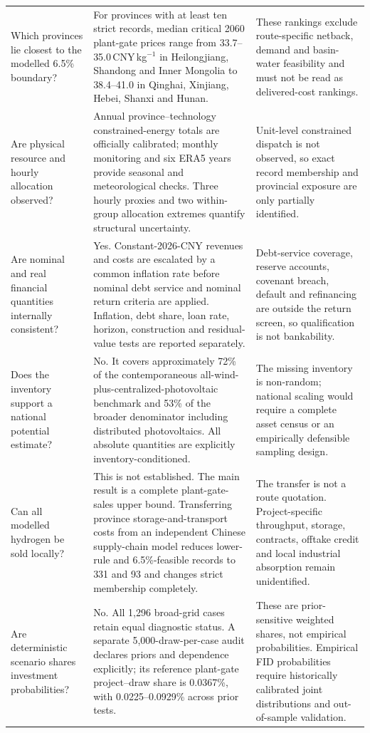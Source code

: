\documentclass[11pt,a4paper]{article}
\begin{document}
\begin{longtable}{>{\raggedright\arraybackslash}p{}>{\raggedright\arraybackslash}p{}>{\raggedright\arraybackslash}p{}}
Which provinces lie closest to the modelled 6.5\% boundary? & For provinces with at least ten strict records, median critical 2060 plant-gate prices range from 33.7--35.0\,CNY\,kg$^{-1}$ in Heilongjiang, Shandong and Inner Mongolia to 38.4--41.0 in Qinghai, Xinjiang, Hebei, Shanxi and Hunan. & These rankings exclude route-specific netback, demand and basin-water feasibility and must not be read as delivered-cost rankings. \\
Are physical resource and hourly allocation observed? & Annual province--technology constrained-energy totals are officially calibrated; monthly monitoring and six ERA5 years provide seasonal and meteorological checks. Three hourly proxies and two within-group allocation extremes quantify structural uncertainty. & Unit-level constrained dispatch is not observed, so exact record membership and provincial exposure are only partially identified. \\
Are nominal and real financial quantities internally consistent? & Yes. Constant-2026-CNY revenues and costs are escalated by a common inflation rate before nominal debt service and nominal return criteria are applied. Inflation, debt share, loan rate, horizon, construction and residual-value tests are reported separately. & Debt-service coverage, reserve accounts, covenant breach, default and refinancing are outside the return screen, so qualification is not bankability. \\
Does the inventory support a national potential estimate? & No. It covers approximately 72\% of the contemporaneous all-wind-plus-centralized-photovoltaic benchmark and 53\% of the broader denominator including distributed photovoltaics. All absolute quantities are explicitly inventory-conditioned. & The missing inventory is non-random; national scaling would require a complete asset census or an empirically defensible sampling design. \\
Can all modelled hydrogen be sold locally? & This is not established. The main result is a complete plant-gate-sales upper bound. Transferring province storage-and-transport costs from an independent Chinese supply-chain model reduces lower-rule and 6.5\%-feasible records to 331 and 93 and changes strict membership completely. & The transfer is not a route quotation. Project-specific throughput, storage, contracts, offtake credit and local industrial absorption remain unidentified. \\
Are deterministic scenario shares investment probabilities? & No. All 1,296 broad-grid cases retain equal diagnostic status. A separate 5,000-draw-per-case audit declares priors and dependence explicitly; its reference plant-gate project--draw share is 0.0367\%, with 0.0225--0.0929\% across prior tests. & These are prior-sensitive weighted shares, not empirical probabilities. Empirical FID probabilities require historically calibrated joint distributions and out-of-sample validation. \\

\end{longtable}
\end{document}
